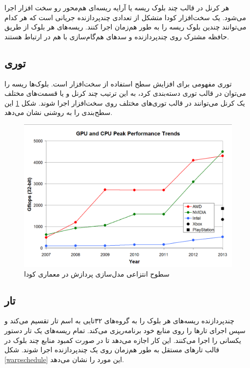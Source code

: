 \documentclass{thesis}
\begin{document}
هر کرنل در قالب چند
بلوک ریسه
یا
آرایه ریسه‌ای هم‌محور
رو سخت افزار اجرا می‌شود. یک سخت‌افزار کودا متشکل از تعدادی چندپردازنده جریانی است که هر کدام می‌توانند چندین بلوک ریسه را به طور هم‌زمان اجرا کنند. ریسه‌های هر بلوک از طریق حافظه مشترک روی چندپردازنده و سد‌های هم‌گام‌سازی
با هم در ارتباط هستند.

\subsection{توری}

توری 
مفهومی برای افزایش سطح استفاده از سخت‌افزار است. بلوک‌ها ریسه را می‌توان در قالب توری دسته‌بندی کرد، به این ترتیب چند کرنل و یا قسمت‌های مختلف یک کرنل می‌توانند در قالب توری‌های مختلف روی سخت‌افزار اجرا شوند. شکل
\ref{grid}
این سطح‌بندی را به روشنی نشان می‌دهد.

\begin{figure}[h]
\centering
\includegraphics[width=\textwidth]{./pics/6}
\caption{
سطوح انتزاعی مدل‌سازی پردازش در معماری کودا
}
\label{grid}
\end{figure}

\subsection{تار}

چندپردازنده ریسه‌های هر بلوک را به گروه‌های ۳۲‌تایی به اسم تار
تقسیم می‌کند و سپس اجرای تار‌ها را روی منابع خود برنامه‌ریزی می‌کند. تمام ریسه‌های یک تار دستور یکسانی را اجرا می‌کنند. این کار اجازه می‌دهد تا در صورت کمبود منابع چند بلوک در قالب تارهای مستقل به طور هم‌زمان روی یک چندپردازنده اجرا شوند. شکل
\ref{warpschedule}
این مورد را نشان می‌دهد.
\end{document}
